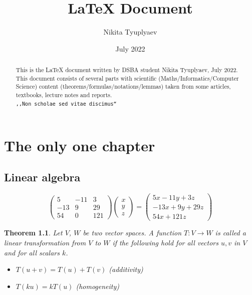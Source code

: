 \documentclass[10pt,a4paper]{report}
\title{LaTeX Document}
\author{Nikita Tyuplyaev}
\date{July 2022}
\theoremstyle{myn}
\theoremstyle{myu}
\newtheorem{theoremu}[theoremn]{Theorem}
\begin{document}
\maketitle

\begin{abstract}
\textsf{This is the LaTeX document written by DSBA student Nikita Tyuplyaev, July 2022. This document consists of several parts with scientific (Maths/Informatics/Computer Science) content (theorems/formulas/notations/lemmas) taken from some articles, textbooks, lecture notes and reports. 
\\\texttt{,,Non scholae sed vitae discimus``} }
\end{abstract}

\tableofcontents 

\chapter{The only one chapter}


\section{Linear algebra}

$$\begin{pmatrix}
            5  & -11 & 3 \\
            -13 &   9 & 29 \\
            54  &   0 & 121
        \end{pmatrix}
        \begin{pmatrix}
            x\\ y\\ z
        \end{pmatrix}
        =
        \begin{pmatrix}
           5x-11y+3z \\
           -13x+9y+29z \\
           54x+121z
        \end{pmatrix}$$

\begin{theoremu}
Let $V$, $W$ be two vector spaces. A function $T \colon V \to W$ is called a {\em linear transformation} from $V$ to $W$ if the following hold for all vectors $u, v$ in $V$ and for all scalars $k$.
\begin{itemize}
\item[(i)] $T (u + v) = T (u) + T (v)$
(additivity)

\item[(ii)] $T (k u) = k T (u)$
(homogeneity)
\end{itemize}
\end{theoremu}
\end{document}
